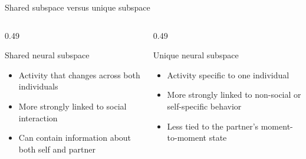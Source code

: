 \documentclass[aspectratio=169,11pt]{beamer}
\begin{document}
\begin{frame}{Shared subspace versus unique subspace}
\begin{columns}[T]
  \begin{column}{0.49\textwidth}
    \begin{block}{Shared neural subspace}
    \begin{itemize}
      \item Activity that changes across both individuals
      \item More strongly linked to social interaction
      \item Can contain information about both self and partner
    \end{itemize}
    \end{block}
  \end{column}
  \begin{column}{0.49\textwidth}
    \begin{block}{Unique neural subspace}
    \begin{itemize}
      \item Activity specific to one individual
      \item More strongly linked to non-social or self-specific behavior
      \item Less tied to the partner's moment-to-moment state
    \end{itemize}
    \end{block}
  \end{column}
\end{columns}
\vspace{0.4em}
\begin{center}
\end{center}
\end{frame}
\end{document}
